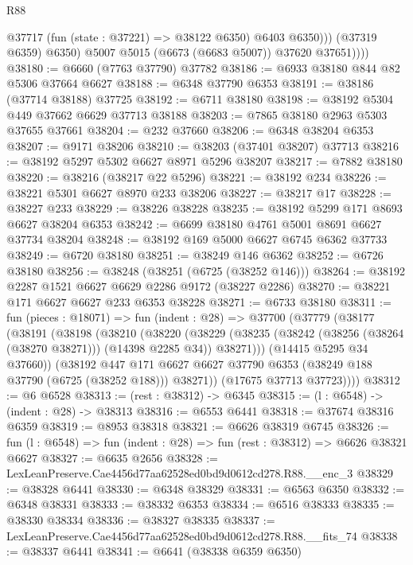 \begin{lexlean}{R88}
\begin{coremodule}
                  @37717 (fun (state : @37221) => @38122 @6350) @6403 @6350)))
              (@37319 @6359)
              @6350)
            @5007
            @5015
            (@6673 (@6683 @5007))
            @37620
            @37651))))
@38180 := @6660 (@7763 @37790) @37782
@38186 := @6933 @38180 @844 @82 @5306 @37664 @6627
@38188 := @6348 @37790 @6353
@38191 := @38186 (@37714 @38188) @37725
@38192 := @6711 @38180
@38198 := @38192 @5304 @449 @37662 @6629 @37713 @38188
@38203 := @7865 @38180 @2963 @5303 @37655 @37661
@38204 := @232 @37660
@38206 := @6348 @38204 @6353
@38207 := @9171 @38206
@38210 := @38203 (@37401 @38207) @37713
@38216 := @38192 @5297 @5302 @6627 @8971 @5296 @38207
@38217 := @7882 @38180
@38220 := @38216 (@38217 @22 @5296)
@38221 := @38192 @234
@38226 := @38221 @5301 @6627 @8970 @233 @38206
@38227 := @38217 @17
@38228 := @38227 @233
@38229 := @38226 @38228
@38235 := @38192 @5299 @171 @8693 @6627 @38204 @6353
@38242 := @6699 @38180 @4761 @5001 @8691 @6627 @37734 @38204
@38248 := @38192 @169 @5000 @6627 @6745 @6362 @37733
@38249 := @6720 @38180
@38251 := @38249 @146 @6362
@38252 := @6726 @38180
@38256 := @38248 (@38251 (@6725 (@38252 @146)))
@38264 := @38192 @2287 @1521 @6627 @6629 @2286 @9172 (@38227 @2286)
@38270 := @38221 @171 @6627 @6627 @233 @6353 @38228
@38271 := @6733 @38180
@38311 := fun (pieces : @18071) =>
  fun (indent : @28) =>
  @37700
    (@37779
      (@38177
        (@38191
          (@38198
            (@38210
              (@38220
                (@38229
                  (@38235 (@38242 (@38256 (@38264 (@38270 @38271))) (@14398 @2285 @34)) @38271)))
              (@14415 @5295 @34 @37660))
            (@38192
              @447
              @171
              @6627
              @6627
              @37790
              @6353
              (@38249 @188 @37790 (@6725 (@38252 @188)))
              @38271))
          (@17675 @37713 @37723))))
@38312 := @6 @6528
@38313 := (rest : @38312) -> @6345
@38315 := (l : @6548) -> (indent : @28) -> @38313
@38316 := @6553 @6441
@38318 := @37674 @38316 @6359
@38319 := @8953 @38318
@38321 := @6626 @38319 @6745
@38326 := fun (l : @6548) => fun (indent : @28) => fun (rest : @38312) => @6626 @38321 @6627
@38327 := @6635 @2656
@38328 := LexLeanPreserve.Cae4456d77aa62528ed0bd9d0612cd278.R88.__enc_3
@38329 := @38328 @6441
@38330 := @6348 @38329
@38331 := @6563 @6350
@38332 := @6348 @38331
@38333 := @38332 @6353
@38334 := @6516 @38333
@38335 := @38330 @38334
@38336 := @38327 @38335
@38337 := LexLeanPreserve.Cae4456d77aa62528ed0bd9d0612cd278.R88.__fits_74
@38338 := @38337 @6441
@38341 := @6641 (@38338 @6359 @6350)

\end{coremodule}
\end{lexlean}
